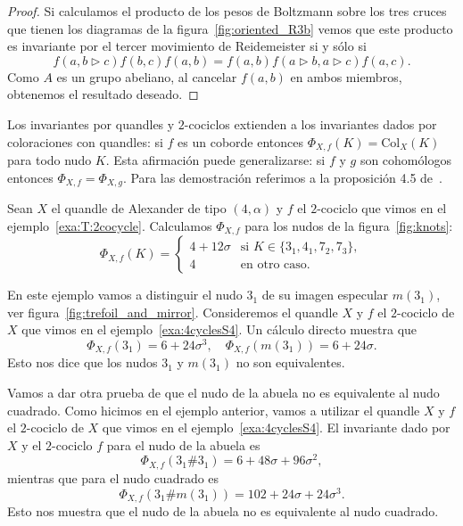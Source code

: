 \documentclass[graybox]{svmult}
\begin{document}
\begin{theorem}
\begin{proof}
	    Si calculamos el producto de los pesos de
        Boltzmann sobre los tres cruces que tienen los diagramas de la
        figura~\ref{fig:oriented_R3b} vemos que este producto es invariante por
        el tercer movimiento de Reidemeister si y sólo si
        \[
        f(a,b\triangleright c)f(b,c)f(a,b)=f(a,b)f(a\triangleright b,a\triangleright c)f(a,c).
        \]
        Como $A$ es un grupo abeliano, al cancelar $f(a,b)$ en ambos miembros,
        obtenemos el resultado deseado.
    \end{proof}
\end{theorem}

\label{block:cocycles_and_colorings}
Los invariantes por quandles y $2$-cociclos extienden a los invariantes dados por
coloraciones con quandles: si $f$ es un coborde entonces
$\Phi_{X,f}(K)=\mathrm{Col}_X(K)$ para todo nudo $K$.	Esta afirmación puede
generalizarse: si $f$ y $g$ son cohomólogos entonces $\Phi_{X,f}=\Phi_{X,g}$.
Para las demostración referimos a la proposición 4.5 de~\cite{MR1990571}.

\begin{example}
	\label{exa:2cocycle:prime_knots}
    Sean $X$ el quandle de Alexander de tipo $(4,\alpha)$ y $f$ el $2$-cociclo
    que vimos en el ejemplo~\ref{exa:T:2cocycle}.  Calculamos  
    $\Phi_{X,f}$ para los nudos de la figura~\ref{fig:knots}:
    \[
    \Phi_{X,f}(K)=\begin{cases}
        4+12\sigma & \text{si $K\in\{3_1,4_1,7_2,7_3\}$},\\
        4 & \text{en otro caso}.
    \end{cases}
    \]
\end{example}

\begin{example}
	\label{exa:2cocycle:3_1andm(3_1)}
    En este ejemplo vamos a distinguir el nudo $3_1$ de su imagen especular
    $m(3_1)$, ver figura~\ref{fig:trefoil_and_mirror}.  Consideremos el quandle
    $X$ y $f$ el $2$-cociclo de $X$ que vimos en el
    ejemplo~\ref{exa:4cyclesS4}.  Un cálculo directo muestra que
    \[
    \Phi_{X,f}(3_1)=6+24\sigma^3,\quad
    \Phi_{X,f}(m(3_1))=6+24\sigma.
    \]
    Esto nos dice que los nudos $3_1$ y $m(3_1)$ no son equivalentes. 
\end{example}

\begin{example}
	\label{exa:granny_vs_square:3}
	Vamos a dar otra prueba de que el nudo de la abuela no es equivalente al nudo cuadrado. 
    Como hicimos en el ejemplo anterior, vamos a utilizar el quandle $X$ y $f$
    el $2$-cociclo de $X$ que vimos en el ejemplo~\ref{exa:4cyclesS4}.  El
    invariante dado por $X$ y el $2$-cociclo $f$ para el nudo de la abuela es
    \[
    \Phi_{X,f}(3_1\#3_1)=6+48\sigma+96\sigma^2,
    \]
    mientras que para el nudo cuadrado es 
    \[
    \Phi_{X,f}(3_1\#m(3_1))=102+24\sigma+24\sigma^3.
    \]
    Esto nos muestra que el nudo de la abuela no es equivalente al nudo
    cuadrado.
\end{example}




\printindex

\end{document}
